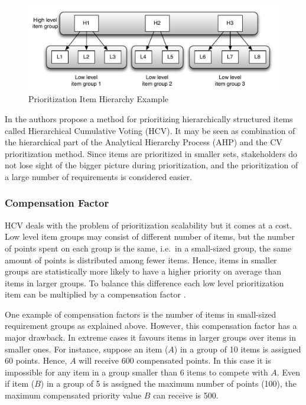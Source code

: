 %
\begin{figure}
\includegraphics[scale=0.45]{fig/hcv-example1}

\caption{\label{fig:Prionitization-Item-Hierarchy}Prioritization Item Hierarchy
Example}
%
\end{figure}


In \citep{Berander2006a} the authors propose a method for prioritizing hierarchically
structured items called Hierarchical Cumulative Voting (HCV). It may
be seen as combination of the hierarchical part of the Analytical Hierarchy
Process (AHP) \citep{Berander2005,Saaty1980a} and the CV prioritization method.
Since items are prioritized in smaller sets, stakeholders do not lose
sight of the bigger picture during prioritization, and the prioritization of a large number
of requirements is considered easier.%


\subsubsection{Compensation Factor\label{sub:Compensation-factor}}

HCV deals with the problem of prioritization scalability but it comes
at a cost. Low level item groups may consist of different number of
items, but the number of points spent on each group is the same, i.e.\ in
a small-sized group, the same amount of points is distributed among fewer items.
Hence, items in smaller groups are statistically more likely to have a higher priority on average
than items in larger groups. To balance this difference each low
level prioritization item can be multiplied by a compensation factor \citep{Berander2006a}.


One example of compensation factors is the number of items in small-sized
requirement groups as explained above. However, this compensation factor
has a major drawback. In extreme cases it favours items in larger groups
over items in smaller ones. For instance, suppose an item ($A$) in a
group of 10 items is assigned 60 points. Hence, $A$ will receive 600
compensated points. In this case it is impossible for any item in
a group smaller than 6 items to compete with $A$. Even if item ($B$) in
a group of 5 is assigned the maximum number of points (100), the maximum compensated
priority value $B$ can receive is 500.

